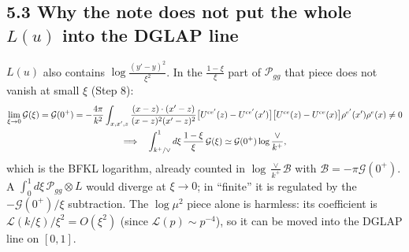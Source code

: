 \documentclass[10pt]{article}
\numberwithin{equation}{section}
\newcommand{\Wop}[2]{\big[U^{ce'}(#2)-U^{ce'}(x')\big]\big[U^{ce}(#1)-U^{ce}(x)\big]\rho^{e'}(x')\rho^{e}(x)}
\newcommand{\Kx}[2]{\frac{(x-#1)\cdot(x'-#2)}{(x-#1)^{2}(x'-#2)^{2}}}
\newcommand{\Lc}{\mathcal L}
\newcommand{\Bc}{\mathcal B}
\begin{document}
\subsection*{5.3 Why the note does not put the whole $L(u)$ into the DGLAP line}
$L(u)$ also contains $\log\frac{(y'-y)^2}{\xi^2}$. In the $\frac{1-\xi}{\xi}$ part of $\mathcal P_{gg}$ that piece does not
vanish at small $\xi$ (Step 8):
\begin{gather}
\lim_{\xi\to0}\mathcal G(\xi)=\mathcal G(0^+)=-\frac{4\pi}{k^2}\int_{x,x',z}\Kx{z}{z}\Wop{z}{z}\neq0\notag\\
\Longrightarrow\quad\int_{k^+/\vee}^1d\xi\,\frac{1-\xi}{\xi}\,\mathcal G(\xi)\simeq\mathcal G(0^+)\log\frac{\vee}{k^+},
\end{gather}
which is the BFKL logarithm, already counted in $\log\frac{\vee}{k^+}\Bc$ with $\Bc=-\pi\mathcal G(0^+)$. A
$\int_0^1d\xi\,\mathcal P_{gg}\otimes L$ would diverge at $\xi\to0$; in ``finite'' it is regulated by the $-\mathcal G(0^+)/\xi$
subtraction. The $\log\mu^2$ piece alone is harmless: its coefficient is $\Lc(k/\xi)/\xi^2=O(\xi^2)$ (since $\Lc(p)\sim p^{-4}$),
so it can be moved into the DGLAP line on $[0,1]$.
\end{document}
